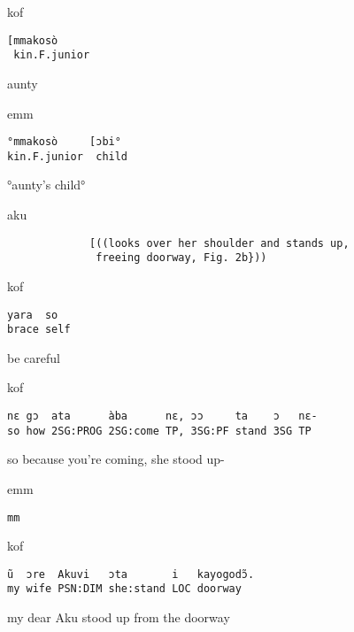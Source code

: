 \documentclass[output=paper]{langsci/langscibook}
\begin{document}
\vspace{-1mm}
%
\begin{mdframednoverticalspace}[style=firstfoc]
\xtransbox{1}{emm}{[((audibly takes some shuffling footsteps toward doorway, Fig. 2a))}
\end{mdframednoverticalspace}
%
\begin{transbox}{2}{kof}
\begin{verbatim}
[mmakosò
 kin.F.junior
\end{verbatim}
\hspace{0.07cm} aunty
\end{transbox}
%
\begin{transbox}{3}{emm}
\begin{verbatim}
°mmakosò     [ɔbi°
kin.F.junior  child
\end{verbatim}
°aunty’s child°
\end{transbox}
%
\begin{mdframednoverticalspace}[style=secondfoc]
\begin{transbox}{4}{aku}
\begin{verbatim}
             [((looks over her shoulder and stands up, 
              freeing doorway, Fig. 2b}))
\end{verbatim}
\end{transbox}
\end{mdframednoverticalspace}
%
\begin{transbox}{5}{kof}
\begin{verbatim}
yara  so
brace self
\end{verbatim}
be careful
\end{transbox}
%
%
\begin{transbox}{7}{kof}
\begin{verbatim}
nɛ gɔ  ata      àba      nɛ, ɔɔ     ta    ɔ   nɛ-
so how 2SG:PROG 2SG:come TP, 3SG:PF stand 3SG TP
\end{verbatim}
so because you’re coming, she stood up-
\end{transbox}
%
\begin{transbox}{8}{emm}
\begin{verbatim}
mm
\end{verbatim}
\end{transbox}
%
\begin{transbox}{9}{kof}
\begin{verbatim}
ũ  ɔre  Akuvi   ɔta       i   kayogodɔ̃.
my wife PSN:DIM she:stand LOC doorway
\end{verbatim}
my dear Aku stood up from the doorway
\end{transbox}
%
\end{document}
